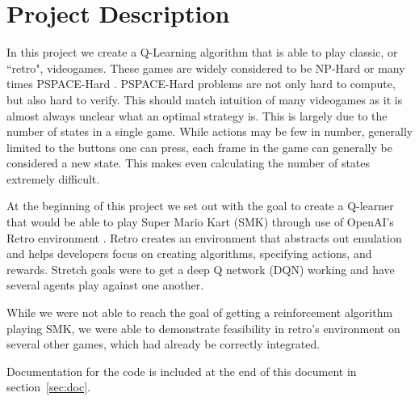 \section{Project Description}
In this project we create a Q-Learning algorithm that is able to play classic,
or ``retro", videogames. These games are widely considered to be NP-Hard or
many times PSPACE-Hard \cite{DBLP}. PSPACE-Hard problems are not only hard to
compute, but also hard to verify. This should match intuition of many videogames
as it is almost always unclear what an optimal strategy is. This is largely due
to the number of states in a single game. While actions may be few in number,
generally limited to the buttons one can press, each frame in the game can 
generally be considered a new state. This makes even calculating the number
of states extremely difficult. 

At the beginning of this project we set out with the goal to create a Q-learner
that would be able to play Super Mario Kart (SMK) \cite{SMK} through use of 
OpenAI's Retro environment \cite{retro}. Retro creates an environment that 
abstracts out emulation and helps developers focus on creating algorithms,
specifying actions, and rewards. Stretch goals were to get a deep Q network 
(DQN) working and have several agents play against one another.

While we were not able to reach the goal of getting a reinforcement algorithm
playing SMK, we were able to demonstrate feasibility in retro's environment on
several other games, which had already be correctly integrated.

Documentation for the code is included at the end of this document in 
section~\ref{sec:doc}.

%
